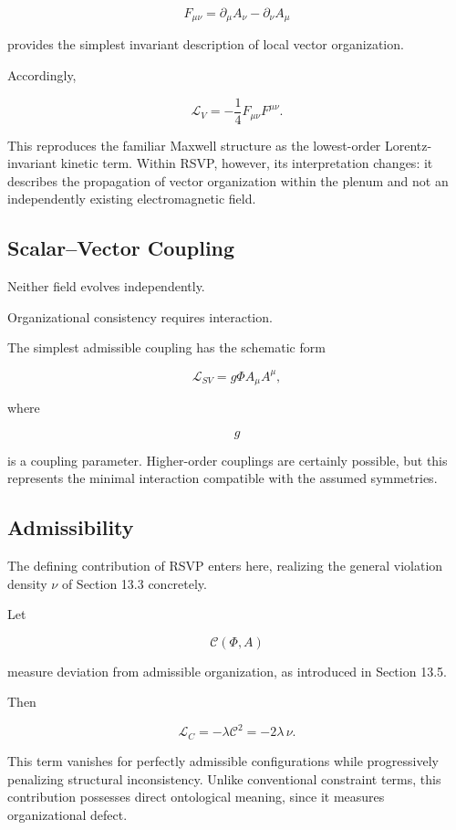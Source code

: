 \documentclass[11pt,oneside]{book}
\numberwithin{equation}{chapter}
\theoremstyle{definition}
\theoremstyle{plain}
\begin{document}
\[
F_{\mu\nu}
=
\partial_\mu A_\nu
-
\partial_\nu A_\mu
\]

provides the simplest invariant description of local vector organization.

Accordingly,

\[
\mathcal L_V
=
-
\frac14
F_{\mu\nu}
F^{\mu\nu}.
\]

This reproduces the familiar Maxwell structure as the lowest-order Lorentz-invariant kinetic term. Within RSVP, however, its interpretation changes: it describes the propagation of vector organization within the plenum and not an independently existing electromagnetic field.

\subsection*{Scalar--Vector Coupling}

Neither field evolves independently.

Organizational consistency requires interaction.

The simplest admissible coupling has the schematic form

\[
\mathcal L_{SV}
=
g
\Phi
A_\mu
A^\mu,
\]

where

\[
g
\]

is a coupling parameter. Higher-order couplings are certainly possible, but this represents the minimal interaction compatible with the assumed symmetries.

\subsection*{Admissibility}

The defining contribution of RSVP enters here, realizing the general
violation density \(\nu\) of Section 13.3 concretely.

Let

\[
\mathcal C(\Phi,A)
\]

measure deviation from admissible organization, as introduced in Section
13.5.

Then

\[
\mathcal L_C
=
-
\lambda
\mathcal C^2
=
-2\lambda\,\nu.
\]

This term vanishes for perfectly admissible configurations while progressively penalizing structural inconsistency. Unlike conventional constraint terms, this contribution possesses direct ontological meaning, since it measures organizational defect.
\end{document}

